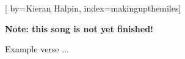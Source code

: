 
[%
    by={Kieran Halpin},
    index={makingupthemiles}]


    \label{makingupthemiles}

    \textbf{Note: this song is not yet finished!}

    \beginverse
        Example verse ...
    \endverse
\endsong
